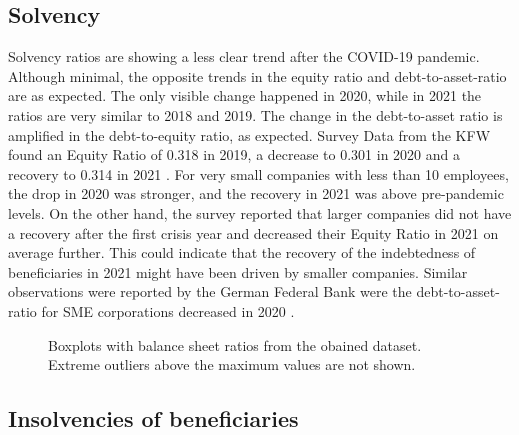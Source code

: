 \subsection{Solvency}

Solvency ratios are showing a less clear trend after the COVID-19 pandemic. Although minimal, the opposite trends in the equity ratio and debt-to-asset-ratio are as expected. The only visible change happened in 2020, while in 2021 the ratios are very similar to 2018 and 2019. The change in the debt-to-asset ratio is amplified in the debt-to-equity ratio, as expected. Survey Data from the KFW found an Equity Ratio of 0.318 in 2019, a decrease to 0.301 in 2020 and a recovery to 0.314 in 2021 \parencite{kfw_kfw-mittelstandspanel_2022}. For very small companies with less than 10 employees, the drop in 2020 was stronger, and the recovery in 2021 was above pre-pandemic levels. On the other hand, the survey reported
that larger companies did not have a recovery after the first crisis year and decreased their Equity Ratio in 2021 on average further. 
This could indicate that the recovery of the indebtedness of beneficiaries in 2021 might have been driven by smaller companies. Similar observations were reported by the German Federal Bank were the debt-to-asset-ratio for SME corporations decreased in 2020 \parencite{deutsche_bundesbank_jahresabschlussstatistik_2022}.



\begin{figure}
\centering
{}%

\decoRule
\caption[Balance sheet ratios]{Boxplots with balance sheet ratios from the obained dataset. Extreme outliers above the maximum values are not shown.}
\label{fig:Ratios}
\end{figure}






\subsection{Insolvencies of beneficiaries}


